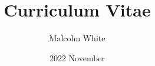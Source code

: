 \title{Curriculum Vitae}
\author{Malcolm White}

\date{2022 November}
\address{50 Oakland St., Floor 2, Medford, MA 02155}
